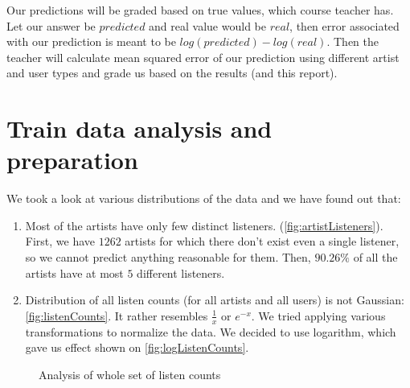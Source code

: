 \documentclass{report}
\begin{document}
Our predictions will be graded based on true values, which course teacher has. Let our answer be $predicted$ and real value would be $real$, then error associated with our prediction is meant to be $log(predicted) - log(real)$. Then the teacher will calculate mean squared error \cite{mse} of our prediction using different artist and user types and grade us based on the results (and this report).

\section{Train data analysis and preparation}
We took a look at various distributions of the data and we have found out that:
\begin{enumerate}[1.]
\item Most of the artists have only few distinct listeners. (\ref{fig:artistListeners}). First, we have $1262$ artists for which there don't exist even a single listener, so we cannot predict anything reasonable for them. Then, $90.26\%$ of all the artists have at most $5$ different listeners.
\item Distribution of all listen counts (for all artists and all users) is not Gaussian: \ref{fig:listenCounts}. It rather resembles $\frac{1}{x}$ or $e^{-x}$. We tried applying various transformations to normalize the data. We decided to use logarithm, which gave us effect shown on \ref{fig:logListenCounts}.
\end{enumerate}
\begin{figure}[!h]
\center
{}

\caption{Analysis of whole set of listen counts}
\end{figure}
\end{document}
